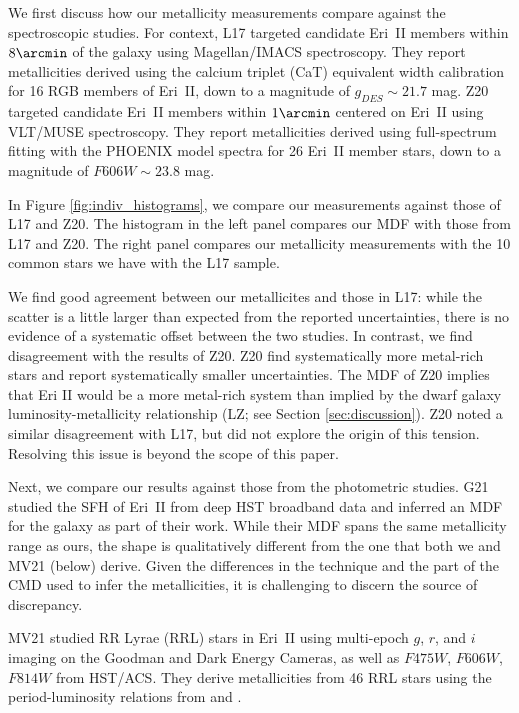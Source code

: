 \documentclass[twocolumn]{aastex63}
\begin{document}
\par We first discuss how our metallicity measurements compare against the spectroscopic studies. For context, L17 targeted candidate Eri~II members within $8\arcmin$ of the galaxy using Magellan/IMACS spectroscopy. They report metallicities derived using the calcium triplet (CaT) equivalent width calibration \citep{carrera2013cat} for 16 RGB members of Eri~II, down to a magnitude of $g_{DES} \sim 21.7$ mag. Z20 targeted candidate Eri~II members within $1\arcmin$ centered on Eri~II using VLT/MUSE spectroscopy. They report metallicities derived using full-spectrum fitting with the PHOENIX model spectra \citep{husser2013phoenix} for 26 Eri~II member stars, down to a magnitude of $F606W \sim 23.8$ mag.

\par In Figure \ref{fig:indiv_histograms}, we compare our measurements against those of L17 and Z20. The histogram in the left panel compares our MDF with those from L17 and Z20. The right panel compares our metallicity measurements with the 10 common stars we have with the L17 sample. 

\par We find good agreement between our metallicites and those in L17: while the scatter is a little larger than expected from the reported uncertainties, there is no evidence of a systematic offset between the two studies. In contrast, we find disagreement with the results of Z20.  Z20 find systematically more metal-rich stars and report systematically smaller uncertainties.  The MDF of Z20 implies that Eri II would be a more metal-rich system than implied by the dwarf galaxy luminosity-metallicity relationship (LZ; see Section \ref{sec:discussion}). Z20 noted a similar disagreement with L17, but did not explore the origin of this tension. Resolving this issue is beyond the scope of this paper. 

\par Next, we compare our results against those from the photometric studies. G21 studied the SFH of Eri~II from deep HST broadband data and inferred an MDF for the galaxy as part of their work. While their MDF spans the same metallicity range as ours, the shape is qualitatively different from the one that both we and MV21 (below) derive. Given the differences in the technique and the part of the CMD used to infer the metallicities, it is challenging to discern the source of discrepancy.

\par MV21 studied RR Lyrae (RRL) stars in Eri~II using multi-epoch $g$, $r$, and $i$ imaging on the Goodman and Dark Energy Cameras, as well as $F475W$, $F606W$, $F814W$ from HST/ACS. They derive metallicities from 46 RRL stars using the period-luminosity relations from \citet{caceres2008} and \citet{marconi2015}.
\end{document}
